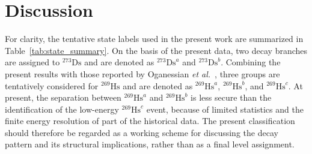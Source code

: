 \documentclass[aps,prc,reprint,superscriptaddress,floatfix]{revtex4-2}
\begin{document}
\section{Discussion}

For clarity, the tentative state labels used in the present work are summarized in Table~\ref{tab:state_summary}. On the basis of the present data, two decay branches are assigned to $^{273}\mathrm{Ds}$ and are denoted as $^{273}\mathrm{Ds}^{a}$ and $^{273}\mathrm{Ds}^{b}$. Combining the present results with those reported by Oganessian \textit{et al.}~\cite{oganessian2024SynthesisDecayProperties}, three groups are tentatively considered for $^{269}\mathrm{Hs}$ and are denoted as $^{269}\mathrm{Hs}^{a}$, $^{269}\mathrm{Hs}^{b}$, and $^{269}\mathrm{Hs}^{c}$. At present, the separation between $^{269}\mathrm{Hs}^{a}$ and $^{269}\mathrm{Hs}^{b}$ is less secure than the identification of the low-energy $^{269}\mathrm{Hs}^{c}$ event, because of limited statistics and the finite energy resolution of part of the historical data. The present classification should therefore be regarded as a working scheme for discussing the decay pattern and its structural implications, rather than as a final level assignment.
\end{document}
